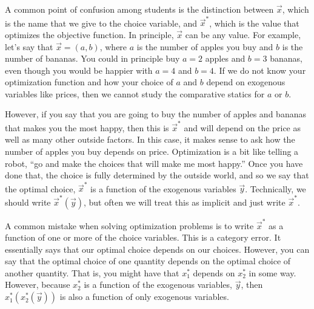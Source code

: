 A common point of confusion among students is the distinction between $\vec{x}$, which is the name that we give to the choice variable, and $\vec{x}^*$, which is the value that optimizes the objective function. In principle, $\vec{x}$ can be any value. For example, let's say that $\vec{x} = (a, b)$, where $a$ is the number of apples you buy and $b$ is the number of bananas. You could in principle buy $a = 2$ apples and $b = 3$ bananas, even though you would be happier with $a = 4$ and $b = 4$. If we do not know your optimization function and how your choice of $a$ and $b$ depend on exogenous variables like prices, then we cannot study the comparative statics for $a$ or $b$.


However, if you say that you are going to buy the number of apples and bananas that makes you the most happy, then this is $\vec{x}^*$ and will depend on the price as well as many other outside factors. In this case, it makes sense to ask how the number of apples you buy depends on price. Optimization is a bit like telling a robot, ``go and make the choices that will make me most happy.'' Once you have done that, the choice is fully determined by the outside world, and so we say that the optimal choice, $\vec{x}^*$ is a function of the exogenous variables $\vec{y}$. Technically, we should write $\vec{x}^*(\vec{y})$, but often we will treat this as implicit and just write $\vec{x}^*$.

A common mistake when solving optimization problems is to write $\vec{x}^*$ as a function of one or more of the choice variables. This is a category error. It essentially says that our optimal choice depends on our choices. However, you can say that the optimal choice of one quantity depends on the optimal choice of another quantity. That is, you might have that $x_1^*$ depends on $x_2^*$ in some way. However, because $x_2^*$ is a function of the exogenous variables, $\vec{y}$, then $x_1^*(x_2^*(\vec{y}))$ is also a function of only exogenous variables. 


